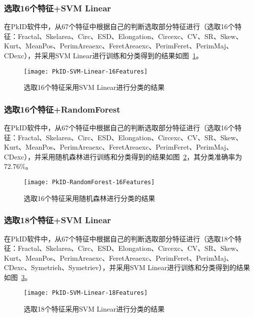 \subsubsection{选取16个特征+SVM Linear}
在PkID软件中，从67个特征中根据自己的判断选取部分特征进行（选取16个特征：Fractal、Skelarea、Circ、ESD、Elongation、Circexc、CV、SR、Skew、Kurt、MeanPos、PerimAreaexc、FeretAreaexc、PerimFeret、PerimMaj、CDexc），并采用SVM Linear进行训练和分类得到的结果如图~\ref{fig:PkID-SVM-Linear-16Features}。

\begin{figure}[!ht]
\centering
\texttt{[image: PkID-SVM-Linear-16Features]}
\caption{选取16个特征采用SVM Linear进行分类的结果}
\label{fig:PkID-SVM-Linear-16Features}
\end{figure}

\subsubsection{选取16个特征+RandomForest}
在PkID软件中，从67个特征中根据自己的判断选取部分特征进行（选取16个特征：Fractal、Skelarea、Circ、ESD、Elongation、Circexc、CV、SR、Skew、Kurt、MeanPos、PerimAreaexc、FeretAreaexc、PerimFeret、PerimMaj、CDexc），并采用随机森林进行训练和分类得到的结果如图~\ref{fig:PkID-RandomForest-16Features}，其分类准确率为72.76\%。

\begin{figure}[!ht]
\centering
\texttt{[image: PkID-RandomForest-16Features]}
\caption{选取16个特征采用随机森林进行分类的结果}
\label{fig:PkID-RandomForest-16Features}
\end{figure}

\subsubsection{选取18个特征+SVM Linear}
在PkID软件中，从67个特征中根据自己的判断选取部分特征进行（选取18个特征：Fractal、Skelarea、Circ、ESD、Elongation、Circexc、CV、SR、Skew、Kurt、MeanPos、PerimAreaexc、FeretAreaexc、PerimFeret、PerimMaj、CDexc、Symetrieh、Symetriev），并采用SVM Linear进行训练和分类得到的结果如图~\ref{fig:PkID-SVM-Linear-18Features}。

\begin{figure}[!ht]
\centering
\texttt{[image: PkID-SVM-Linear-18Features]}
\caption{选取18个特征采用SVM Linear进行分类的结果}
\label{fig:PkID-SVM-Linear-18Features}
\end{figure}

